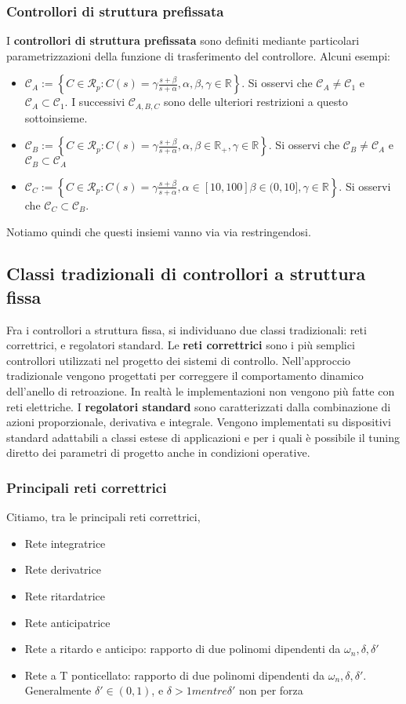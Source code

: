 \documentclass[11pt]{article}
\begin{document}
\subsubsection{Controllori di struttura prefissata}
I \textbf{controllori di struttura prefissata} sono definiti mediante particolari parametrizzazioni della funzione di trasferimento del controllore. Alcuni esempi:
\begin{itemize}
    \item $\mathcal{C}_A := \left\{C\in\mathcal{R}_p:C(s)=\gamma \frac{s+\beta}{s+\alpha}, \alpha, \beta, \gamma \in \mathbb{R}\right\}$. Si osservi che $\mathcal{C}_A \neq \mathcal{C}_1$ e $\mathcal{C}_A \subset \mathcal{C}_1$. I successivi $\mathcal{C}_{A,B,C}$ sono delle ulteriori restrizioni a questo sottoinsieme.
    \item $\mathcal{C}_B := \left\{C\in\mathcal{R}_p:C(s)=\gamma \frac{s+\beta}{s+\alpha}, \alpha, \beta \in \mathbb{R}_+,\gamma \in \mathbb{R} \right\}$. Si osservi che $\mathcal{C}_B \neq \mathcal{C}_A$ e $\mathcal{C}_B \subset \mathcal{C}_A$
    \item $\mathcal{C}_C := \left\{C\in\mathcal{R}_p:C(s)=\gamma \frac{s+\beta}{s+\alpha}, \alpha \in [10,100] \beta \in (0,10],\gamma \in \mathbb{R} \right\}$. Si osservi che $\mathcal{C}_C \subset \mathcal{C}_B$.
\end{itemize}
Notiamo quindi che questi insiemi vanno via via restringendosi. 
\subsection{Classi tradizionali di controllori a struttura fissa}
Fra i controllori a struttura fissa, si individuano due classi tradizionali: reti correttrici, e regolatori standard. Le \textbf{reti correttrici} sono i più semplici controllori utilizzati nel progetto dei sistemi di controllo. Nell'approccio tradizionale vengono progettati per correggere il comportamento dinamico dell'anello di retroazione. In realtà le implementazioni non vengono più fatte con reti elettriche. I \textbf{regolatori standard} sono caratterizzati dalla combinazione di azioni proporzionale, derivativa e integrale. Vengono implementati su dispositivi standard adattabili a classi estese di applicazioni e per i quali è possibile il tuning diretto dei parametri di progetto anche in condizioni operative. 
\subsubsection{Principali reti correttrici}
Citiamo, tra le principali reti correttrici, 
\begin{itemize}
    \item Rete integratrice
    \item Rete derivatrice
    \item Rete ritardatrice
    \item Rete anticipatrice
    \item Rete a ritardo e anticipo: rapporto di due polinomi dipendenti da $\omega_n, \delta, \delta'$
    \item Rete a T ponticellato: rapporto di due polinomi dipendenti da $\omega_n, \delta, \delta'$. Generalmente $\delta'\in (0,1)$, e $\delta>1 mentre \delta'$ non per forza
\end{itemize}
\end{document}
